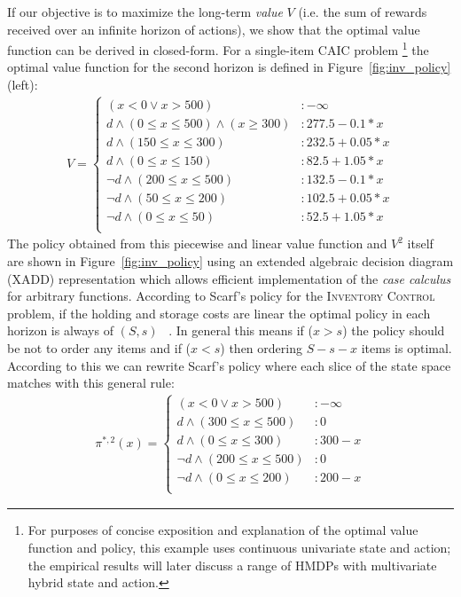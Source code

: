 \documentclass[twoside,11pt]{article}
\newcommand{\InventoryControl}{\textsc{Inventory Control }}
\begin{document}
If our objective is to maximize the long-term \emph{value} $V$ (i.e. the sum of rewards received over an infinite horizon of actions), we show that the optimal value function can be derived in closed-form. 
For a single-item CAIC problem \footnote{For purposes of concise exposition and explanation
of the optimal value function and policy, this example uses
continuous univariate state and action;
the empirical results will later discuss a range of HMDPs with
multivariate hybrid state and action.}
the optimal value function for the second horizon is defined in Figure~\ref{fig:inv_policy} (left):
\vspace{-3mm}
\begin{align}
V = \begin{cases}
(x < 0 \vee x>500) &: -\infty \\
d \land (0 \leq x \leq 500) \land (x \geq 300) &:  277.5 - 0.1 * x \\
d \land (150 \leq x \leq 300) &:  232.5 + 0.05 * x \\
d \land ( 0 \leq x \leq 150) &:  82.5 + 1.05 * x \\
\neg d \land (200 \leq x \leq 500)  &:  132.5 - 0.1 * x \\
\neg d \land (50 \leq x \leq 200) &: 102.5 + 0.05 * x \\
\neg d \land (0 \leq x \leq 50) &:  52.5 + 1.05 * x \\
\end{cases} 
\label{eq:vfun_inv}
\end{align}
The policy obtained from this piecewise and linear value function and $V^2$ itself are shown in Figure~\ref{fig:inv_policy} using an extended algebraic decision diagram (XADD) representation which allows efficient implementation of the \emph{case calculus} for arbitrary functions. According to Scarf's policy for the \InventoryControl problem, if the holding and storage costs are linear the optimal policy in each horizon is always of $(S,s)$ ~\cite{Scarf_Karlin58}. In general this means if ($x>s$) the policy should be not to order any items and if ($x<s$) then ordering $S-s-x$ items is optimal. 
According to this we can rewrite Scarf's policy where each slice of the state space matches with this general rule: 
\begin{align}
\pi^{*,2}(x) = 
\begin{cases}
(x < 0 \vee x>500) &: -\infty \\
d \land (300 \leq x \leq 500)  &:  0 \\
d \land (0 \leq x \leq 300) &:  300 - x \\
\neg d \land (200 \leq x \leq 500) &:  0 \\
\neg d \land (0 \leq x \leq 200) &:  200 - x \\
\end{cases}\nonumber
\end{align}
\end{document}
